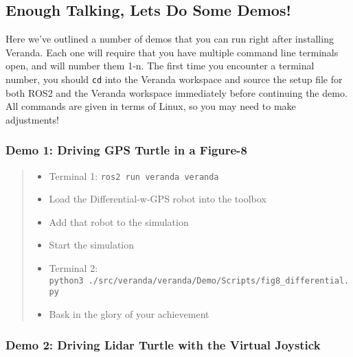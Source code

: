 \hypertarget{enough-talking-lets-do-some-demos}{%
\subsection{Enough Talking, Lets Do Some
Demos!}\label{enough-talking-lets-do-some-demos}}

Here we've outlined a number of demos that you can run right after
installing Veranda. Each one will require that you have multiple command
line terminals open, and will number them 1-n. The first time you
encounter a terminal number, you should \texttt{cd} into the Veranda
workspace and source the setup file for both ROS2 and the Veranda
workspace immediately before continuing the demo. All commands are given
in terms of Linux, so you may need to make adjustments!

\hypertarget{demo-1-driving-gps-turtle-in-a-figure-8}{%
\subsubsection{Demo 1: Driving GPS Turtle in a
Figure-8}\label{demo-1-driving-gps-turtle-in-a-figure-8}}

\begin{quote}
\begin{itemize}
\tightlist
\item
  Terminal 1: \texttt{ros2\ run\ veranda\ veranda}
\item
  Load the Differential-w-GPS robot into the toolbox
\item
  Add that robot to the simulation
\item
  Start the simulation
\item
  Terminal 2:
  \texttt{python3\ ./src/veranda/veranda/Demo/Scripts/fig8\_differential.py}
\item
  Bask in the glory of your achievement
\end{itemize}
\end{quote}

\hypertarget{demo-2-driving-lidar-turtle-with-the-virtual-joystick}{%
\subsubsection{Demo 2: Driving Lidar Turtle with the Virtual
Joystick}\label{demo-2-driving-lidar-turtle-with-the-virtual-joystick}}

